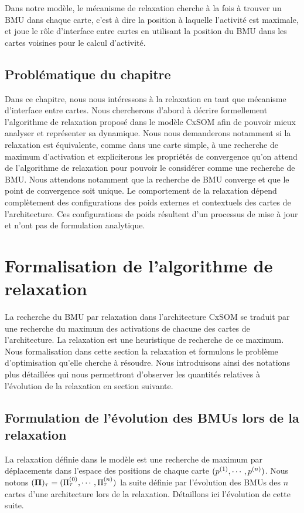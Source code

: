 \documentclass[../main]{subfiles}
\begin{document}
Dans notre modèle, le mécanisme de relaxation cherche à la fois à trouver un BMU dans chaque carte, c'est à  dire la position à laquelle l'activité est maximale, et joue le rôle d'interface entre cartes en utilisant la position du BMU dans les cartes voisines pour le calcul d'activité. 

\subsection{Problématique du chapitre}

Dans ce chapitre, nous nous intéressons à la relaxation en tant que mécanisme d'interface entre cartes.
Nous chercherons d'abord à décrire formellement l'algorithme de relaxation proposé dans le modèle CxSOM afin de pouvoir mieux analyser et représenter sa dynamique. 
Nous nous demanderons notamment si la relaxation est équivalente, comme dans une carte simple, à une recherche de maximum d'activation et expliciterons les propriétés de convergence qu'on attend de l'algorithme de relaxation pour pouvoir le considérer comme une recherche de BMU. Nous attendons notamment que la recherche de BMU converge et que le point de convergence soit unique.
Le comportement de la relaxation dépend complètement des configurations des poids externes et contextuels des cartes de l'architecture. Ces configurations de poids résultent d'un processus de mise à jour et n'ont pas de formulation analytique.

\section{Formalisation de l'algorithme de relaxation}

La recherche du BMU par relaxation dans l'architecture CxSOM se traduit par une recherche du maximum des activations de chacune des cartes de l'architecture.
La relaxation est une heuristique de recherche de ce maximum.
Nous formalisation dans cette section la relaxation et formulons le problème d'optimisation qu'elle cherche à résoudre. 
Nous introduisons ainsi des notations plus détaillées qui nous permettront d'observer les quantités relatives à l'évolution de la relaxation en section suivante.

\subsection{Formulation de l'évolution des BMUs lors de la relaxation}

La relaxation définie dans le modèle est une recherche de maximum par déplacements dans l'espace des positions de chaque carte $(p^{({1})},\cdots, p^{({n})})$.
Nous notons $(\mathbf{\Pi})_\tau = (\Pi^{({0})}_\tau,\cdots,\Pi^{({n})}_\tau)$ la suite définie par l'évolution des BMUs des $n$ cartes d'une architecture lors de la relaxation.
Détaillons ici l'évolution de cette suite.
\end{document}

